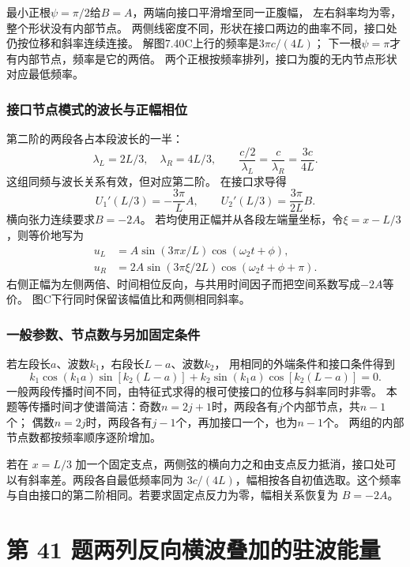\documentclass[UTF8,fontset=fandol,a4paper,11pt]{ctexart}
\begin{document}
最小正根$\psi=\pi/2$给$B=A$，两端向接口平滑增至同一正腹幅，
左右斜率均为零，整个形状没有内部节点。
两侧线密度不同，形状在接口两边的曲率不同，接口处仍按位移和斜率连续连接。
解图7.40C上行的频率是$3\pi c/(4L)$；
下一根$\psi=\pi$才有内部节点，频率是它的两倍。
两个正根按频率排列，接口为腹的无内节点形状对应最低频率。

\subsubsection*{接口节点模式的波长与正幅相位}
第二阶的两段各占本段波长的一半：
\[
\lambda_L=2L/3,\quad\lambda_R=4L/3,\qquad
\frac{c/2}{\lambda_L}=\frac{c}{\lambda_R}=\frac{3c}{4L}.
\]
这组同频与波长关系有效，但对应第二阶。
在接口求导得
\[
U_1'(L/3)=-\frac{3\pi}{L}A,\qquad
U_2'(L/3)=\frac{3\pi}{2L}B.
\]
横向张力连续要求$B=-2A$。
若均使用正幅并从各段左端量坐标，令$\xi=x-L/3$，则等价地写为
\[
\begin{aligned}
u_L&=A\sin(3\pi x/L)\cos(\omega_2t+\phi),\\
u_R&=2A\sin(3\pi\xi/2L)\cos(\omega_2t+\phi+\pi).
\end{aligned}
\]
右侧正幅为左侧两倍、时间相位反向，与共用时间因子而把空间系数写成$-2A$等价。
图C下行同时保留该幅值比和两侧相同斜率。

\subsubsection*{一般参数、节点数与另加固定条件}
若左段长$a$、波数$k_1$，右段长$L-a$、波数$k_2$，
用相同的外端条件和接口条件得到
\[
k_1\cos(k_1a)\sin[k_2(L-a)]
+k_2\sin(k_1a)\cos[k_2(L-a)]=0.
\]
一般两段传播时间不同，由特征式求得的根可使接口的位移与斜率同时非零。
本题等传播时间才使谱简洁：奇数$n=2j+1$时，两段各有$j$个内部节点，共$n-1$个；
偶数$n=2j$时，两段各有$j-1$个，再加接口一个，也为$n-1$个。
两组的内部节点数都按频率顺序逐阶增加。

若在 $x=L/3$ 加一个固定支点，两侧弦的横向力之和由支点反力抵消，接口处可以有斜率差。两段各自最低频率同为 $3c/(4L)$，幅相按各自初值选取。这个频率与自由接口的第二阶相同。若要求固定点反力为零，幅相关系恢复为 $B=-2A$。




\section*{第 41 题\quad 两列反向横波叠加的驻波能量}
\end{document}
